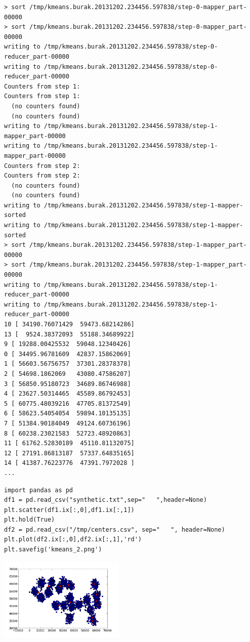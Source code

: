 \documentclass[12pt,fleqn]{article}\usepackage{../common}
\begin{document}
\begin{verbatim}
> sort /tmp/kmeans.burak.20131202.234456.597838/step-0-mapper_part-00000
> sort /tmp/kmeans.burak.20131202.234456.597838/step-0-mapper_part-00000
writing to /tmp/kmeans.burak.20131202.234456.597838/step-0-reducer_part-00000
writing to /tmp/kmeans.burak.20131202.234456.597838/step-0-reducer_part-00000
Counters from step 1:
Counters from step 1:
  (no counters found)
  (no counters found)
writing to /tmp/kmeans.burak.20131202.234456.597838/step-1-mapper_part-00000
writing to /tmp/kmeans.burak.20131202.234456.597838/step-1-mapper_part-00000
Counters from step 2:
Counters from step 2:
  (no counters found)
  (no counters found)
writing to /tmp/kmeans.burak.20131202.234456.597838/step-1-mapper-sorted
writing to /tmp/kmeans.burak.20131202.234456.597838/step-1-mapper-sorted
> sort /tmp/kmeans.burak.20131202.234456.597838/step-1-mapper_part-00000
> sort /tmp/kmeans.burak.20131202.234456.597838/step-1-mapper_part-00000
writing to /tmp/kmeans.burak.20131202.234456.597838/step-1-reducer_part-00000
writing to /tmp/kmeans.burak.20131202.234456.597838/step-1-reducer_part-00000
10 [ 34190.76071429  59473.68214286]
13 [  9524.38372093  55188.34689922]
9 [ 19288.00425532  59048.12340426]
0 [ 34495.96781609  42837.15862069]
1 [ 56603.56756757  37301.28378378]
2 [ 54698.1862069   43080.47586207]
3 [ 56850.95180723  34689.86746988]
4 [ 23627.50314465  45589.86792453]
5 [ 60775.48039216  47705.81372549]
6 [ 58623.54054054  59894.10135135]
7 [ 51384.90184049  49124.60736196]
8 [ 60238.23021583  52723.48920863]
11 [ 61762.52830189  45110.81132075]
12 [ 27191.86813187  57337.64835165]
14 [ 41387.76223776  47391.7972028 ]       
...
\end{verbatim}

\begin{verbatim}
import pandas as pd
df1 = pd.read_csv("synthetic.txt",sep="   ",header=None)
plt.scatter(df1.ix[:,0],df1.ix[:,1])
plt.hold(True)
df2 = pd.read_csv("/tmp/centers.csv", sep="   ", header=None)
plt.plot(df2.ix[:,0],df2.ix[:,1],'rd')
plt.savefig('kmeans_2.png')
\end{verbatim}

\includegraphics[height=4cm]{kmeans_2.png}
\end{document}
